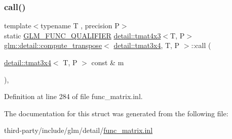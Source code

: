 \subsubsection{\texorpdfstring{call()}{call()}}
{\footnotesize\ttfamily template$<$typename T , precision P$>$ \\
static \hyperlink{setup_8hpp_a33fdea6f91c5f834105f7415e2a64407}{G\+L\+M\+\_\+\+F\+U\+N\+C\+\_\+\+Q\+U\+A\+L\+I\+F\+I\+ER} \hyperlink{structglm_1_1detail_1_1tmat4x3}{detail\+::tmat4x3}$<$T, P$>$ \hyperlink{structglm_1_1detail_1_1compute__transpose}{glm\+::detail\+::compute\+\_\+transpose}$<$ \hyperlink{structglm_1_1detail_1_1tmat3x4}{detail\+::tmat3x4}, T, P $>$\+::call (\begin{DoxyParamCaption}\item[{\hyperlink{structglm_1_1detail_1_1tmat3x4}{detail\+::tmat3x4}$<$ T, P $>$ const \&}]{m }\end{DoxyParamCaption})\hspace{0.3cm}{\ttfamily [inline]}, {\ttfamily [static]}}



Definition at line 284 of file func\+\_\+matrix.\+inl.



The documentation for this struct was generated from the following file\+:\begin{DoxyCompactItemize}
\item 
third-\/party/include/glm/detail/\hyperlink{func__matrix_8inl}{func\+\_\+matrix.\+inl}\end{DoxyCompactItemize}
